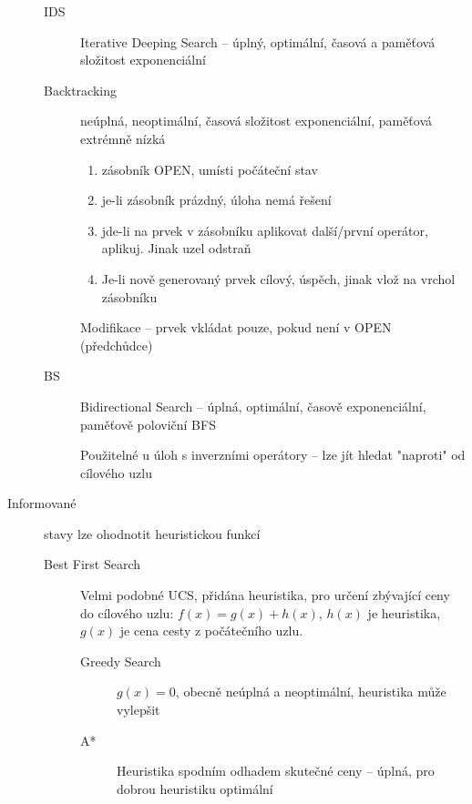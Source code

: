 \documentclass[a4wide]{report}
\begin{document}
\begin{description}
\begin{description}
		\item[IDS] Iterative Deeping Search -- úplný, optimální, časová a paměťová složitost exponenciální
		
		\item[Backtracking] neúplná, neoptimální, časová složitost exponenciální, paměťová extrémně nízká
		\begin{enumerate}
			\item zásobník OPEN, umísti počáteční stav
			\item je-li zásobník prázdný, úloha nemá řešení
			\item jde-li na prvek v zásobníku aplikovat další/první operátor, aplikuj. Jinak uzel odstraň
			\item Je-li nově generovaný prvek cílový, úspěch, jinak vlož na vrchol zásobníku
		\end{enumerate}
		Modifikace -- prvek vkládat pouze, pokud není v OPEN (předchůdce)
		
		\item[BS] Bidirectional Search -- úplná, optimální, časově exponenciální, paměťově poloviční BFS
		
		Použitelné u úloh s inverzními operátory -- lze jít hledat "naproti" od cílového uzlu
	\end{description}
	\item[Informované] stavy lze ohodnotit heuristickou funkcí
	\begin{description}
		\item[Best First Search] Velmi podobné UCS, přidána heuristika, pro určení zbývající ceny do cílového uzlu: $f(x) = g(x) + h(x)$, $h(x)$ je heuristika, $g(x)$ je cena cesty z počátečního uzlu.
		
		\begin{description}
			\item[Greedy Search] $g(x) = 0$, obecně neúplná a neoptimální, heuristika může vylepšit
			
			\item[A*] Heuristika spodním odhadem skutečné ceny -- úplná, pro dobrou heuristiku optimální
			

\end{description}
\end{description}
\end{description}
\end{document}
